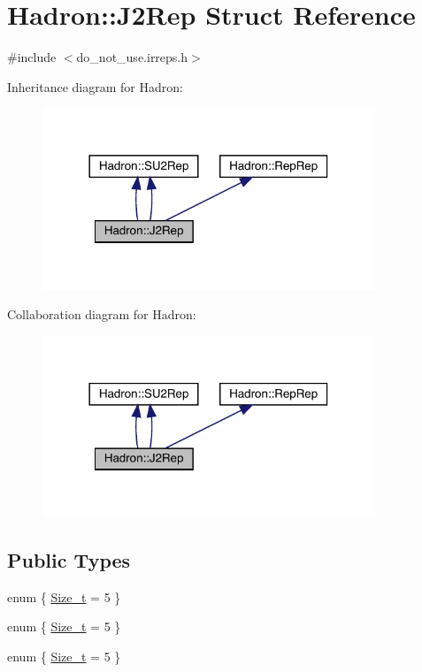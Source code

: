 \hypertarget{structHadron_1_1J2Rep}{}\section{Hadron\+:\+:J2\+Rep Struct Reference}
\label{structHadron_1_1J2Rep}


{\ttfamily \#include $<$do\+\_\+not\+\_\+use.\+irreps.\+h$>$}



Inheritance diagram for Hadron\+:\nopagebreak
\begin{figure}[H]
\begin{center}
\leavevmode
\includegraphics[width=282pt]{d9/d08/structHadron_1_1J2Rep__inherit__graph}
\end{center}
\end{figure}


Collaboration diagram for Hadron\+:\nopagebreak
\begin{figure}[H]
\begin{center}
\leavevmode
\includegraphics[width=282pt]{d5/d39/structHadron_1_1J2Rep__coll__graph}
\end{center}
\end{figure}
\subsection*{Public Types}
\begin{DoxyCompactItemize}
\item 
enum \{ \mbox{\hyperlink{structHadron_1_1J2Rep_ada5bd88745be9a9b3c8e852aebd01725af373966e0fdf5720e95e95a61443a265}{Size\+\_\+t}} = 5
 \}
\item 
enum \{ \mbox{\hyperlink{structHadron_1_1J2Rep_ada5bd88745be9a9b3c8e852aebd01725af373966e0fdf5720e95e95a61443a265}{Size\+\_\+t}} = 5
 \}
\item 
enum \{ \mbox{\hyperlink{structHadron_1_1J2Rep_ada5bd88745be9a9b3c8e852aebd01725af373966e0fdf5720e95e95a61443a265}{Size\+\_\+t}} = 5
 \}
\end{DoxyCompactItemize}
